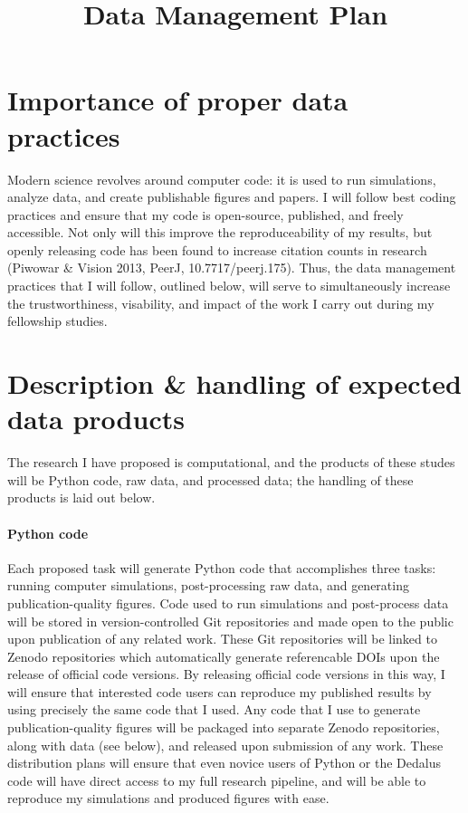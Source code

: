 \documentclass[11pt, preprint]{aastex}
\begin{document}
\title{Data Management Plan}
\maketitle
\thispagestyle{fancy}

\vspace{-1.2cm}
\section*{Importance of proper data practices}
\vspace{-0.3cm}
Modern science revolves around computer code: it is used to run simulations, analyze data, and create publishable figures and papers.
I will follow best coding practices and ensure that my code is open-source, published, and freely accessible.
Not only will this improve the reproduceability of my results, but openly releasing code has been found to increase citation counts in research (Piwowar \& Vision 2013, PeerJ, 10.7717/peerj.175).
Thus, the data management practices that I will follow, outlined below, will serve to simultaneously increase the trustworthiness, visability, and impact of the work I carry out during my fellowship studies.

\vspace{-0.75cm}
\section*{Description \& handling of expected data products}
\vspace{-0.3cm}
The research I have proposed is computational, and the products of these studes will be Python code, raw data, and processed data; the handling of these products is laid out below.

\vspace{-0.5cm}
\paragraph*{Python code}
Each proposed task will generate Python code that accomplishes three tasks: running computer simulations, post-processing raw data, and generating publication-quality figures.
Code used to run simulations and post-process data will be stored in version-controlled Git repositories and made open to the public upon publication of any related work.
These Git repositories will be linked to Zenodo repositories which automatically generate referencable DOIs upon the release of official code versions.
By releasing official code versions in this way, I will ensure that interested code users can reproduce my published results by using precisely the same code that I used.
Any code that I use to generate publication-quality figures will be packaged into separate Zenodo repositories, along with data (see below), and released upon submission of any work.
These distribution plans will ensure that even novice users of Python or the Dedalus code will have direct access to my full research pipeline, and will be able to reproduce my simulations and produced figures with ease.
\end{document}
